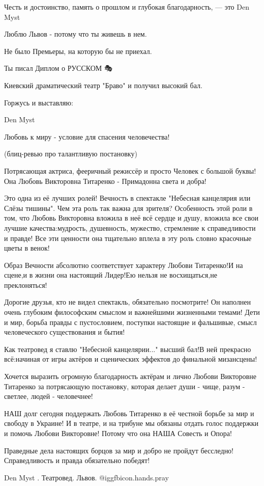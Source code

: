 Честь и достоинство, память о прошлом и 
глубокая благодарность, — это Den Myst

Люблю Львов - потому что ты живешь в нем. 

Не было Премьеры, на которую бы не приехал. 

Ты писал Диплом о РУССКОМ 🎭

Киевский драматический театр "Браво" и получил высокий бал. 

Горжусь и выставляю:

Den Myst 

Любовь к миру - условие для спасения человечества!

(блиц-ревью про талантливую постановку)

Потрясающая актриса, фееричный режиссёр и просто Человек с большой буквы! Она
Любовь Викторовна Титаренко - Примадонна света и добра!

Это одна из её лучших ролей! Вечность в спектакле "Небесная канцелярия или Слёзы
тишины". Чем эта роль так важна для зрителя? Особенность этой роли в том, что
Любовь Викторовна вложила в неё всё сердце и душу, вложила все свои лучшие
качества:мудрость, душевность, мужество, стремление к справедливости и
правде! Все эти ценности она тщательно вплела в эту роль словно красочные цветы
в венок!

Образ Вечности абсолютно соответствует характеру Любови Титаренко!И на сцене,и
в жизни она настоящий Лидер!Ею нельзя не восхищаться,не преклоняться!

Дорогие друзья, кто не видел спектакль, обязательно посмотрите! Он наполнен очень
глубоким философским смыслом и важнейшими жизненными темами! Дети и мир, борьба
правды с пустословием, поступки настоящие и фальшивые, смысл человеческого
существования и бытия!

Как театровед я ставлю "Небесной канцелярии..." высший бал!В ней прекрасно
всё:начиная от игры актёров и сценических эффектов до финальной мизансцены!

Хочется выразить огромную благодарность актёрам и лично Любови Викторовне
Титаренко за потрясающую постановку, которая делает души -
чище, разум - светлее, людей - человечнее!

НАШ долг сегодня поддержать Любовь Титаренко в её честной борьбе за мир и
свободу в Украине! И в театре, и на трибуне мы обязаны отдать голос поддержки и
помочь Любови Викторовне! Потому что она НАША Совесть и Опора!

Праведные дела настоящих борцов за мир и добро не пройдут
бесследно! Справедливость и правда обязательно победят!

Den Myst . Театровед.  Львов. @igg{fbicon.hands.pray} 
